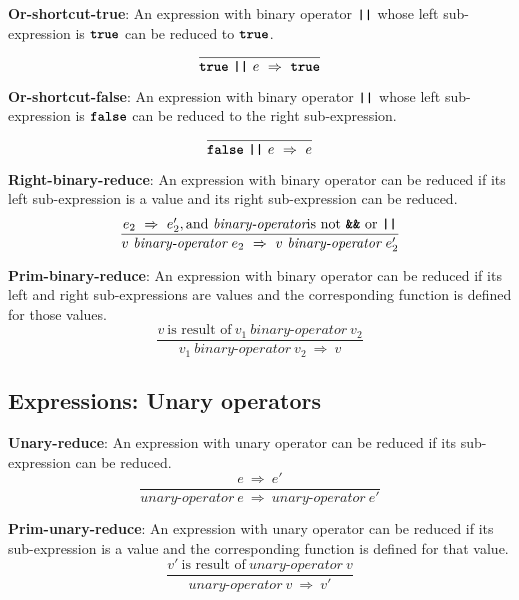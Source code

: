 \vspace{10mm}
\textbf{Or-shortcut-true}: An expression with binary operator
$\textbf{\texttt{||}}$ whose left sub-expression is
$\textbf{\texttt{true}}$ can be reduced to
$\textbf{\texttt{true}}$.
\[
\frac{
}{
  \textbf{\texttt{true}}\  \textbf{\texttt{||}}\ e
  \ \Rightarrow \ 
  \textbf{\texttt{true}}
}
\]

\vspace{10mm}
\textbf{Or-shortcut-false}: An expression with binary operator
$\textbf{\texttt{||}}$ whose left sub-expression is
$\textbf{\texttt{false}}$ can be reduced to
the right sub-expression.
\[
\frac{
}{
  \textbf{\texttt{false}}\  \textbf{\texttt{||}}\ e
  \ \Rightarrow \ 
  e
}
\]

\vspace{10mm}
\textbf{Right-binary-reduce}: An expression with binary operator
can be reduced if its left sub-expression is a value and its right
sub-expression can be reduced.
\[
\frac{
  e_2\ \Rightarrow\ e_2', \textrm{and}\ \textit{binary-operator}
  \mbox{is not}\ \textbf{\texttt{\&\&}}\ \textrm{or}\ \texttt{\textbf{||}}
}{
  v\  \textit{binary-operator} \ e_2
  \ \Rightarrow \ 
  v\  \textit{binary-operator} \ e_2'
}
\]

\vspace{10mm}
\textbf{Prim-binary-reduce}: An expression with binary operator
can be reduced if its left and right sub-expressions are values and
the corresponding function is defined for those values.
\[
\frac{
  v\ \mbox{is result of}\ v_1\  \textit{binary-operator} \ v_2
}{
  v_1\  \textit{binary-operator} \ v_2
  \ \Rightarrow \ 
  v
}
\]

\subsection*{Expressions: Unary operators}

\textbf{Unary-reduce}: An expression with unary operator
can be reduced if its sub-expression can be reduced.
\[
\frac{
  e \ \Rightarrow \ e'
}{
  \textit{unary-operator} \ e
  \ \Rightarrow \ 
  \textit{unary-operator} \ e'
}
\]

\vspace{10mm}
\textbf{Prim-unary-reduce}: An expression with unary operator
can be reduced if its sub-expression is a value and
the corresponding function is defined for that value.
\[
\frac{
  v'\ \mbox{is result of}\ \textit{unary-operator} \ v
}{
  \textit{unary-operator} \ v
  \ \Rightarrow \ 
  v'
}
\]

